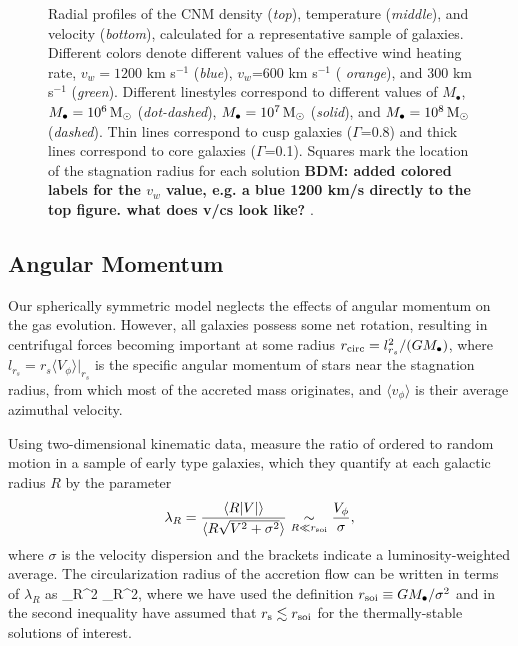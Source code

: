 \documentclass[usenatbib,fleqn]{mn2e}
\newcommand{\Mbh}[1][]{M_{\bullet#1}}
\newcommand{\vwO}{v_{w}}
\begin{document}
\begin{figure}
  \caption{\label{fig:profiles}Radial profiles of the CNM density
    ({\it top}), temperature ({\it middle}), and velocity ({\it bottom}),
    calculated for a representative sample of galaxies.  Different colors
    denote different values of the effective wind heating rate,
    $\vwO=1200$ km s$^{-1}$ ({\it blue}), $\vwO$=600 km s$^{-1}$ ({\it
      orange}), and 300 km s$^{-1}$ ({\it green}).  Different
    linestyles correspond to different values of $\Mbh$, $\Mbh=10^6
    \Msun$ ({\it dot-dashed}), $\Mbh=10^7 \Msun$ ({\it solid}), and
    $\Mbh=10^8 \Msun$ ({\it dashed}). Thin lines correspond to cusp
    galaxies ($\Gamma$=0.8) and thick lines correspond to core
    galaxies ($\Gamma$=0.1). Squares mark the location of
    the stagnation radius for each solution {\bf BDM: added colored labels for the $v_w$ value, e.g. a blue 1200 km/s directly to the top figure.  what does v/cs look like?} .
 }
\end{figure}

  \subsection{Angular Momentum}
  \label{sec:ang}

Our spherically symmetric model neglects the effects of angular momentum on the gas evolution.  However, all galaxies possess some net rotation, resulting in centrifugal forces becoming important at some radius $r_{\rm circ} = l_{r_{s}}^{2}/(GM_{\bullet})$, where $l_{r_{s}} = r_{s}\langle V_{\phi}\rangle |_{r_s}$ is the specific angular momentum of stars near the stagnation radius, from which most of the accreted mass originates, and $\langle v_{\phi}\rangle$ is their average azimuthal velocity.    

Using two-dimensional kinematic data, \citet{EmsellemCappellari+:2007a} measure the ratio of ordered to random motion in a sample of early type galaxies, which they quantify at each galactic radius $R$ by the parameter
  \begin{align}
    \lambda_R=\frac{\langle R|V|\rangle}{\langle R\sqrt{V^2+\sigma^2}\rangle} \underset{R \ll r_{\rm soi}}\sim \frac{V_{\phi}}{\sigma},
  \end{align}
where $\sigma$ is the velocity dispersion and the brackets indicate a luminosity-weighted average.  The circularization radius of the accretion flow can be written in terms of $\lambda_R$ as
\be
{} \approx {}\lambda_{R}^{2} \lesssim \lambda_{R}^{2},
\label{eq:rcirc}
\ee
where we have used the definition $r_{\rm soi} \equiv GM_{\bullet}/\sigma^{2}$ and in the second inequality have assumed that $r_{\rm s} \lesssim r_{\rm soi}$ for the thermally-stable solutions of interest.
\end{document}
